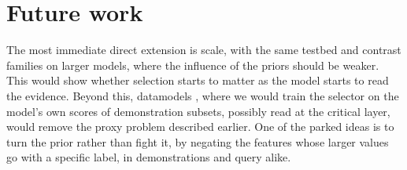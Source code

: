 \section{Future work}
The most immediate direct extension is scale, with the same testbed and contrast families on larger models, where the influence of the priors should be weaker. This would show whether selection starts to matter as the model starts to read the evidence. Beyond this, datamodels \citep{ilyas2022datamodels,chang2023data}, where we would train the selector on the model's own scores of demonstration subsets, possibly read at the critical layer, would remove the proxy problem described earlier. One of the parked ideas is to turn the prior rather than fight it, by negating the features whose larger values go with a specific label, in demonstrations and query alike.


